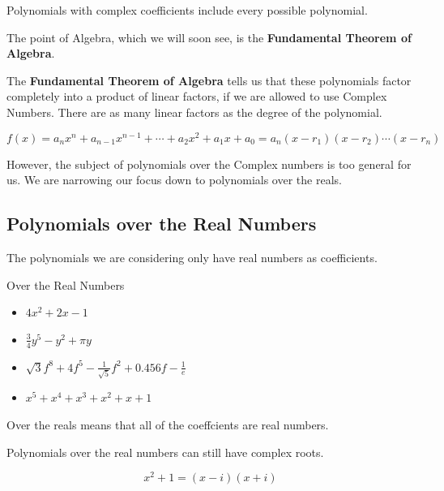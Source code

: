 \documentclass{ximera}
\begin{document}
Polynomials with complex coefficients include every possible polynomial.  



The point of Algebra, which we will soon see, is the \textbf{Fundamental Theorem of Algebra}. 



The \textbf{Fundamental Theorem of Algebra} tells us that these polynomials factor completely into a product of linear factors, if we are allowed to use Complex Numbers. There are as many linear factors as the degree of the polynomial.



\[   f(x) = a_n x^n + a_{n-1} x^{n-1} + \cdots + a_2 x^2 + a_1 x + a_0   =   a_n (x - r_1) (x - r_2) \cdots (x - r_n)  \]


However, the subject of polynomials over the Complex numbers is too general for us.  We are narrowing our focus down to polynomials over the reals.




\subsection*{Polynomials over the Real Numbers}


The polynomials we are considering only have real numbers as coefficients.


\begin{example} Over the Real Numbers



\begin{itemize}
\item $4 x^2 + 2 x -1$
\item $\frac{3}{4} y^5 - y^2 + \pi y$
\item $\sqrt{3} f^8 + 4 f^5 - \frac{1}{\sqrt{5}} f^2 + 0.456 f - \frac{1}{e}$
\item $x^5 + x^4 + x^3 + x^2 + x + 1$
\end{itemize}



\end{example}






Over the reals means that all of the coeffcients are real numbers.



Polynomials over the real numbers can still have complex roots.

\[  x^2 + 1 = (x - i)(x + i)       \]
\end{document}

